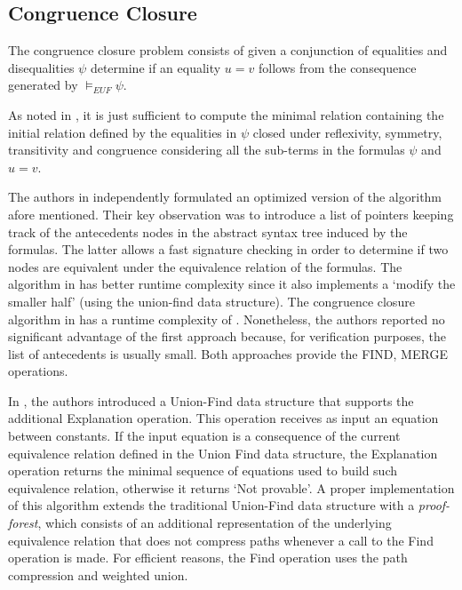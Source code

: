 \subsection{Congruence Closure}

The congruence closure problem consists of given a 
conjunction of equalities and disequalities $\psi$ 
determine if an equality $u = v$ follows from the 
consequence generated by $\models_{EUF} 
\psi$.

As noted in \cite{10.5555/1097042}, it is just sufficient
to compute the minimal relation containing the initial 
relation defined by the
equalities in $\psi$ closed under reflexivity, symmetry,
transitivity and congruence considering all the sub-terms
in the formulas $\psi$ and $u = v$.

The authors in \cite{10.1145/322217.322228, 
10.1145/322186.322198} independently formulated an optimized
version of the algorithm afore mentioned. Their key observation
was to introduce a list of pointers keeping track of the
antecedents nodes in the abstract syntax tree induced by
the formulas. The latter allows a fast signature checking
in order to determine if two nodes are equivalent under
the equivalence relation of the formulas. The algorithm
in \cite{10.1145/322217.322228} has better runtime
complexity  since it also implements 
a `modify the smaller half' (using the union-find 
data structure). The congruence closure algorithm in 
\cite{10.1145/322217.322228} has a runtime complexity
of . Nonetheless, the authors reported no 
significant advantage of the first approach
because, for verification purposes, the list of antecedents is
usually small. Both approaches provide the FIND, MERGE 
operations.

In \cite{10.1007/978-3-540-32033-3_33}, the authors 
introduced a Union-Find data structure that supports the 
additional 
Explanation operation. This operation receives as input 
an equation between constants. If the input equation is 
a consequence of the current equivalence relation defined 
in the Union Find data structure, the Explanation operation 
returns the minimal sequence of equations used to build 
such equivalence relation, otherwise it returns 
`Not provable'. A proper implementation of this algorithm 
extends the traditional Union-Find data structure with 
a \emph{proof-forest}, which consists of an additional 
representation of the underlying equivalence relation that 
does not compress paths whenever a call to the Find 
operation is made. For efficient reasons, the Find 
operation uses the path compression and weighted union.

